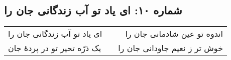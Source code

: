 \begin{center}
\section*{شماره ۱۰: ای یاد تو آب زندگانی جان را}
\label{sec:010}
\begin{longtable}{l p{0.5cm} r}
ای یاد تو آب زندگانی جان را
&&
اندوه تو عین شادمانی جان را
\\
یک ذرّه تحیر تو در پردهٔ جان
&&
خوش تر ز نعیم جاودانی جان را
\\
\end{longtable}
\end{center}
